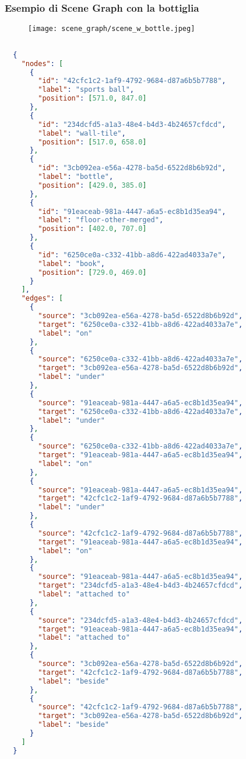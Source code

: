 \subsubsection{Esempio di Scene Graph con la bottiglia}
\begin{figure}[H]
  \centering
  \texttt{[image: scene\_graph/scene\_w\_bottle.jpeg]}
\end{figure}
\begin{lstlisting}[language=json]
  
  {
    "nodes": [
      {
        "id": "42cfc1c2-1af9-4792-9684-d87a6b5b7788",
        "label": "sports ball",
        "position": [571.0, 847.0]
      },
      {
        "id": "234dcfd5-a1a3-48e4-b4d3-4b24657cfdcd",
        "label": "wall-tile",
        "position": [517.0, 658.0]
      },
      {
        "id": "3cb092ea-e56a-4278-ba5d-6522d8b6b92d",
        "label": "bottle",
        "position": [429.0, 385.0]
      },
      {
        "id": "91eaceab-981a-4447-a6a5-ec8b1d35ea94",
        "label": "floor-other-merged",
        "position": [402.0, 707.0]
      },
      {
        "id": "6250ce0a-c332-41bb-a8d6-422ad4033a7e",
        "label": "book",
        "position": [729.0, 469.0]
      }
    ],
    "edges": [
      {
        "source": "3cb092ea-e56a-4278-ba5d-6522d8b6b92d",
        "target": "6250ce0a-c332-41bb-a8d6-422ad4033a7e",
        "label": "on"
      },
      {
        "source": "6250ce0a-c332-41bb-a8d6-422ad4033a7e",
        "target": "3cb092ea-e56a-4278-ba5d-6522d8b6b92d",
        "label": "under"
      },
      {
        "source": "91eaceab-981a-4447-a6a5-ec8b1d35ea94",
        "target": "6250ce0a-c332-41bb-a8d6-422ad4033a7e",
        "label": "under"
      },
      {
        "source": "6250ce0a-c332-41bb-a8d6-422ad4033a7e",
        "target": "91eaceab-981a-4447-a6a5-ec8b1d35ea94",
        "label": "on"
      },
      {
        "source": "91eaceab-981a-4447-a6a5-ec8b1d35ea94",
        "target": "42cfc1c2-1af9-4792-9684-d87a6b5b7788",
        "label": "under"
      },
      {
        "source": "42cfc1c2-1af9-4792-9684-d87a6b5b7788",
        "target": "91eaceab-981a-4447-a6a5-ec8b1d35ea94",
        "label": "on"
      },
      {
        "source": "91eaceab-981a-4447-a6a5-ec8b1d35ea94",
        "target": "234dcfd5-a1a3-48e4-b4d3-4b24657cfdcd",
        "label": "attached to"
      },
      {
        "source": "234dcfd5-a1a3-48e4-b4d3-4b24657cfdcd",
        "target": "91eaceab-981a-4447-a6a5-ec8b1d35ea94",
        "label": "attached to"
      },
      {
        "source": "3cb092ea-e56a-4278-ba5d-6522d8b6b92d",
        "target": "42cfc1c2-1af9-4792-9684-d87a6b5b7788",
        "label": "beside"
      },
      {
        "source": "42cfc1c2-1af9-4792-9684-d87a6b5b7788",
        "target": "3cb092ea-e56a-4278-ba5d-6522d8b6b92d",
        "label": "beside"
      }
    ]
  }
\end{lstlisting}


